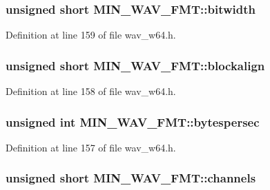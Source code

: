 \subsubsection[{\texorpdfstring{bitwidth}{bitwidth}}]{\setlength{\rightskip}{0pt plus 5cm}unsigned short M\+I\+N\+\_\+\+W\+A\+V\+\_\+\+F\+M\+T\+::bitwidth}\hypertarget{struct_m_i_n___w_a_v___f_m_t_a5672d93ddd4a0794696f136eab834594}{}\label{struct_m_i_n___w_a_v___f_m_t_a5672d93ddd4a0794696f136eab834594}


Definition at line 159 of file wav\+\_\+w64.\+h.

\subsubsection[{\texorpdfstring{blockalign}{blockalign}}]{\setlength{\rightskip}{0pt plus 5cm}unsigned short M\+I\+N\+\_\+\+W\+A\+V\+\_\+\+F\+M\+T\+::blockalign}\hypertarget{struct_m_i_n___w_a_v___f_m_t_ac00f95eaa3e2e6476362a74c51655a00}{}\label{struct_m_i_n___w_a_v___f_m_t_ac00f95eaa3e2e6476362a74c51655a00}


Definition at line 158 of file wav\+\_\+w64.\+h.

\subsubsection[{\texorpdfstring{bytespersec}{bytespersec}}]{\setlength{\rightskip}{0pt plus 5cm}unsigned {\bf int} M\+I\+N\+\_\+\+W\+A\+V\+\_\+\+F\+M\+T\+::bytespersec}\hypertarget{struct_m_i_n___w_a_v___f_m_t_afc868f9c7893d4ab71b1a4fdce483dd1}{}\label{struct_m_i_n___w_a_v___f_m_t_afc868f9c7893d4ab71b1a4fdce483dd1}


Definition at line 157 of file wav\+\_\+w64.\+h.

\subsubsection[{\texorpdfstring{channels}{channels}}]{\setlength{\rightskip}{0pt plus 5cm}unsigned short M\+I\+N\+\_\+\+W\+A\+V\+\_\+\+F\+M\+T\+::channels}\hypertarget{struct_m_i_n___w_a_v___f_m_t_a272fcd8ef29fdafd7811523cddb92ad0}{}\label{struct_m_i_n___w_a_v___f_m_t_a272fcd8ef29fdafd7811523cddb92ad0}


